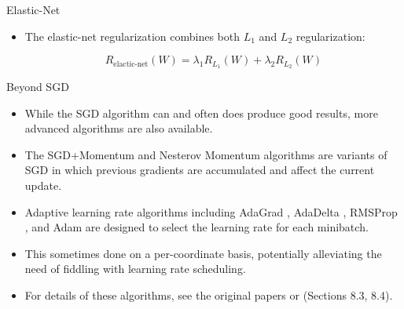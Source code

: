 \documentclass[handout]{beamer}
\begin{document}
\begin{frame}{Elastic-Net}
\begin{scriptsize}
\begin{itemize}
  \item  The elastic-net regularization \cite{zou2005regularization} combines both $L_1$ and $L_2$ regularization:
 
 \begin{displaymath}
  R_{\text{elactic-net}}(W) = \lambda_{1}R_{L_{1}}(W) + \lambda_{2}R_{L_{2}}(W)
 \end{displaymath}

  
\end{itemize}
\end{scriptsize}

\end{frame}



\begin{frame}{Beyond SGD}
\begin{scriptsize}
\begin{itemize}

 \item While the SGD algorithm can and often does produce good results, more advanced algorithms are also available. 
 \item The SGD+Momentum \cite{polyak1964some} and Nesterov Momentum \cite{nesterov2018lectures,sutskever2013importance}  algorithms are variants of SGD in which previous gradients are accumulated and affect the current update. 
\item Adaptive learning rate algorithms including AdaGrad \cite{duchi2011adaptive}, AdaDelta \cite{zeiler2012adadelta}, RMSProp \cite{tieleman2012lecture}, and Adam \cite{kingma2014adam} are designed to select the learning rate for each minibatch.
\item This sometimes done on a per-coordinate basis, potentially alleviating the need of fiddling with learning rate scheduling. 
\item For details of these algorithms, see the original papers or \cite{goodfellow2016deep}(Sections 8.3, 8.4).
 
\end{itemize}
\end{scriptsize}

\end{frame}
\end{document}
